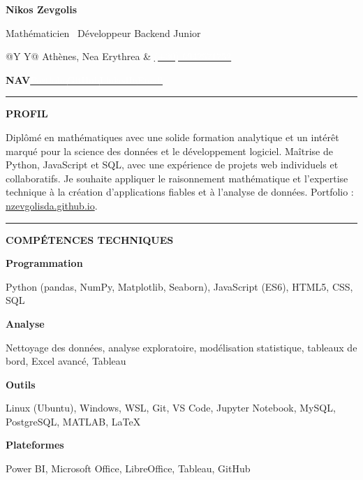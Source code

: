 \documentclass[10pt,a4paper]{article}
\newcommand{\sectiontitle}[1]{%
    \vspace{0.38em}%
    {\color{accent}\rule{0.08\textwidth}{1.4pt}}\hspace{0.55em}%
    {\small\bfseries\color{ink}\MakeUppercase{#1}}\par
    \vspace{0.18em}
}
\newcommand{\cvrow}[2]{%
    {\small\bfseries\color{accent}#1}\par
    {\small\color{ink}#2}\par\vspace{0.08em}
}
\begin{document}
\noindent\colorbox{ink}{%
    \parbox{\dimexpr\textwidth-2\fboxsep\relax}{%
        \vspace{0.15em}
        {\fontsize{27}{30}\selectfont\bfseries\color{white}Nikos Zevgolis}\par
        \vspace{2pt}
        {\large\color{accent}Mathématicien \textbar\ Développeur Backend Junior}\par
        \vspace{7pt}
        \begin{tabularx}{\linewidth}{@{}Y Y@{}}
            {\footnotesize\color{white}\faMapMarker\hspace{0.35em}Athènes, Nea Erythrea} &
            {\footnotesize\color{white}\href{tel:+306942571752}{\textcolor{white}{\faPhone\hspace{0.35em}(+30) 6942571752}}}\\
        \end{tabularx}\par\vspace{3pt}
        \parbox{\linewidth}{\footnotesize\color{white}\textbf{NAV}\hspace{0.8em}\href{https://nzevgolisda.github.io/}{\textcolor{white}{Portfolio}}\hspace{1.1em}\href{https://github.com/nzevgolisda}{\textcolor{white}{GitHub}}\hspace{1.1em}\href{https://www.linkedin.com/in/nikos-zevgolis-2193871b7/}{\textcolor{white}{LinkedIn}}\hspace{1.1em}\href{mailto:nzevgolisda@gmail.com}{\textcolor{white}{Email}}}
        \vspace{0.45em}
    }%
}\par

\sectiontitle{Profil}
Diplômé en mathématiques avec une solide formation analytique et un intérêt marqué pour la science des données et le développement logiciel. Maîtrise de Python, JavaScript et SQL, avec une expérience de projets web individuels et collaboratifs. Je souhaite appliquer le raisonnement mathématique et l’expertise technique à la création d’applications fiables et à l’analyse de données. Portfolio : \href{https://nzevgolisda.github.io/}{nzevgolisda.github.io}.

\sectiontitle{Compétences techniques}
\cvrow{Programmation}{Python (pandas, NumPy, Matplotlib, Seaborn), JavaScript (ES6), HTML5, CSS, SQL}
\cvrow{Analyse}{Nettoyage des données, analyse exploratoire, modélisation statistique, tableaux de bord, Excel avancé, Tableau}
\cvrow{Outils}{Linux (Ubuntu), Windows, WSL, Git, VS Code, Jupyter Notebook, MySQL, PostgreSQL, MATLAB, \LaTeX}
\cvrow{Plateformes}{Power BI, Microsoft Office, LibreOffice, Tableau, GitHub}
\end{document}

